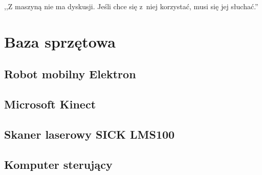 

\begin{savequote}[70mm]
,,Z maszyną nie ma dyskusji. Jeśli chce się z~niej korzystać, musi się jej słuchać.''
\end{savequote}


\chapter{Baza sprzętowa}
\label{chap:sprzet}

\section{Robot mobilny Elektron}
\section{Microsoft Kinect}
\section{Skaner laserowy SICK LMS100}
\section{Komputer sterujący}
